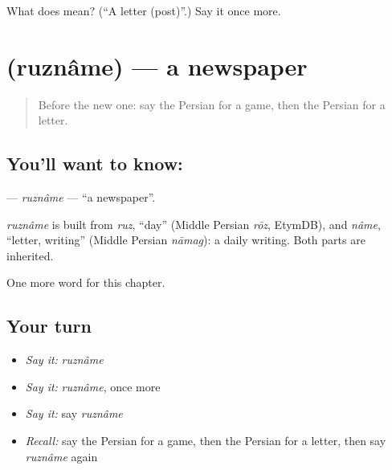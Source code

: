 \begin{tcolorbox}[breakable,colback=teal!4,colframe=teal!35!black,title={Before you move on}]
What does  mean? (\textquotedblleft{}A letter (post)\textquotedblright{}.) Say it once more.
\end{tcolorbox}
\section[\texorpdfstring{\fa{روزنامه} (ruznâme)}{روزنامه (ruznâme)}]{ (ruznâme) — a newspaper}

\label{lesson:FA-C51-ruzname}



\begin{quote}
Before the new one: say the Persian for a game, then the Persian for a letter.
\end{quote}

\subsection*{You'll want to know: }
\textbf{} — \emph{ruznâme} — \textquotedblleft{}a newspaper\textquotedblright{}.

\begin{cousinweb}
\emph{ruznâme} is built from \emph{ruz}, \textquotedblleft{}day\textquotedblright{} (Middle Persian \emph{rōz}, EtymDB), and \emph{nâme}, \textquotedblleft{}letter, writing\textquotedblright{} (Middle Persian \emph{nāmag}): a daily writing. Both parts are inherited.
\end{cousinweb}

\begin{grammarlens}[title={What you've built}]
One more word for this chapter.
\end{grammarlens}

\subsection*{Your turn}
\begin{itemize}
\raggedright
  \item \emph{Say it:} \emph{ruznâme}
  \item \emph{Say it:} \emph{ruznâme}, once more
  \item \emph{Say it:} say \emph{ruznâme}
  \item \emph{Recall:} say the Persian for a game, then the Persian for a letter, then say \emph{ruznâme} again
\end{itemize}

